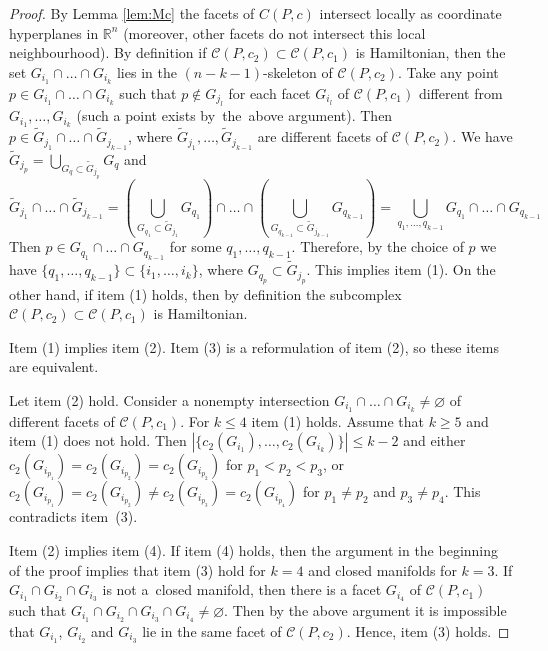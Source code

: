 \documentclass[12pt]{amsart}
\theoremstyle{definition}
\theoremstyle{remark}
\begin{document}
\begin{proof}
By Lemma \ref{lem:Mc} the facets of $C(P,c)$ intersect locally as coordinate hyperplanes in $\mathbb R^n$ (moreover,
other facets do not intersect this local neighbourhood). By definition 
if $\mathcal{C}(P,c_2)\subset \mathcal{C}(P,c_1)$ is Hamiltonian, then the set $G_{i_1}\cap \dots\cap G_{i_k}$ 
lies in the $(n-k-1)$-skeleton of $\mathcal{C}(P,c_2)$. Take any point $p\in G_{i_1}\cap \dots\cap G_{i_k}$
such that $p\not\in G_{j_l}$ for each facet $G_{i_l}$ of $\mathcal{C}(P,c_1)$ different from $G_{i_1},\dots, G_{i_k}$ 
(such a point exists by~the~above argument). Then 
$p\in \widetilde{G}_{j_1}\cap \dots\cap \widetilde{G}_{j_{k-1}}$, where 
$\widetilde{G}_{j_1}, \dots, \widetilde{G}_{j_{k-1}}$ are different facets of $\mathcal{C}(P,c_2)$. We have
$ \widetilde{G}_{j_p}=\bigcup\limits_{G_q\subset \widetilde{G}_{j_p}}G_q$ and 
$$
\widetilde{G}_{j_1}\cap \dots\cap \widetilde{G}_{j_{k-1}}=\left(\bigcup\limits_{G_{q_1}\subset \widetilde{G}_{j_1}}G_{q_1}\right)
\cap\dots\cap\left(\bigcup\limits_{G_{q_{k-1}}\subset \widetilde{G}_{j_{k-1}}}G_{q_{k-1}}\right)=
\bigcup\limits_{q_1,\dots,q_{k-1}}G_{q_1}\cap\dots\cap G_{q_{k-1}}
$$
Then $p\in G_{q_1}\cap\dots\cap G_{q_{k-1}} $ for some $q_1,\dots, q_{k-1}$. Therefore, by the choice 
of $p$ we have $\{q_1,\dots,q_{k-1}\}\subset \{i_1,\dots,i_k\}$, where $G_{q_p}\subset  \widetilde{G}_{j_p}$.  This implies 
item (1). On the other hand, if item (1) holds, then by definition the subcomplex $\mathcal{C}(P,c_2)\subset \mathcal{C}(P,c_1)$
is Hamiltonian.

Item (1) implies item (2). Item (3) is a reformulation of item (2), so these items are equivalent.

Let item (2) hold.  Consider a nonempty intersection  $G_{i_1}\cap \dots\cap G_{i_k}\ne\varnothing$ of different facets 
of $\mathcal{C}(P,c_1)$. For $k\leqslant 4$ item (1) holds. Assume that $k\geqslant 5$ and item (1) does not hold. 
Then $|\{c_2(G_{i_1}),\dots, c_2(G_{i_k})\}|\leqslant k-2$ and either $c_2(G_{i_{p_1}})=c_2(G_{i_{p_2}})=c_2(G_{i_{p_2}})$
for $p_1<p_2<p_3$, or~$c_2(G_{i_{p_1}})=c_2(G_{i_{p_2}})
\ne c_2(G_{i_{p_3}})=c_2(G_{i_{p_4}})$
for $p_1\ne p_2$ and $p_3\ne p_4$. This contradicts item~(3). 

Item (2) implies item (4). If item (4) holds, then the argument in the beginning of the proof
implies that item (3) hold for $k=4$ and closed manifolds for $k=3$. If $G_{i_1}\cap G_{i_2}\cap G_{i_3}$
is not a~closed manifold, then there is a facet $G_{i_4}$ of $\mathcal{C}(P,c_1)$ such that 
$G_{i_1}\cap G_{i_2}\cap G_{i_3}\cap G_{i_4}\ne\varnothing$. Then by the above argument it is 
impossible that $G_{i_1}$, $G_{i_2}$ and $G_{i_3}$ lie in the same facet of $\mathcal{C}(P,c_2)$. 
Hence, item (3) holds. 
\end{proof}
\end{document}
